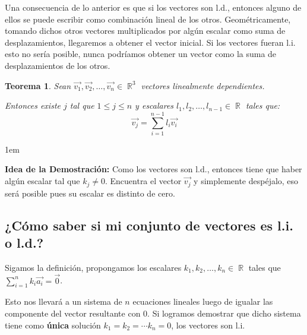 \documentclass[12pt, fleqn]{report}                             %
\newenvironment{SmallIndentation}[1][0.75em]                    %
    {\begin{adjustwidth}{#1}{}\begin{footnotesize}}                 %
    {\end{footnotesize}\end{adjustwidth}}                           %
\newtheorem{Theorem}{Teorema}[section]                          %
\DeclareMathOperator \Reals        {\mathbb{R}}                 %
\begin{document}
                Una consecuencia de lo anterior es que si los vectores son l.d., entonces alguno de ellos se puede
                escribir como combinación lineal de los otros. Geométricamente, tomando dichos otros vectores
                multiplicados por algún escalar como suma de desplazamientos, llegaremos a obtener el vector inicial.
                Si los vectores fueran l.i. esto no sería posible, nunca podríamos obtener un vector como la suma de
                desplazamientos de los otros.
            
                \begin{Theorem}
                    Sean $\vec{v_1}, \vec{v_2}, \ldots, \vec{v_n} \in \Reals^3$ vectores linealmente dependientes.

                    Entonces existe $j$ tal que $1 \leq j \leq n$ y escalares $l_1, l_2, \ldots, l_{n-1} \in \Reals$
                    tales que:
                    \begin{equation*}
                        \vec{v_j} = \sum_{i=1}^{n-1} l_i \vec{v_i}   
                    \end{equation*}
                \end{Theorem}
        
                \begin{SmallIndentation}[1em]
                    \textbf{Idea de la Demostración:} 
                        Como los vectores son l.d., entonces tiene que haber algún escalar
                        tal que $k_j \neq 0$. Encuentra el vector $\vec{v_j}$ y simplemente
                        despéjalo, eso será posible pues su escalar es distinto de cero.
                \end{SmallIndentation}
            

            \subsection{¿Cómo saber si mi conjunto de vectores es l.i. o l.d.?}
            
                Sigamos la definición, propongamos los escalares $k_1, k_2, \ldots, k_n \in \Reals$
                tales que $\sum_{i=1}^{n} k_i \vec{a_i} = \vec{0}$.

                Esto nos llevará a un sistema de $n$ ecuaciones lineales luego de igualar las componente
                del vector resultante con 0. Si logramos demostrar que dicho sistema tiene como \textbf{única}
                solución $k_1 = k_2 = \cdots k_n = 0$, los vectores son l.i.
\end{document}
